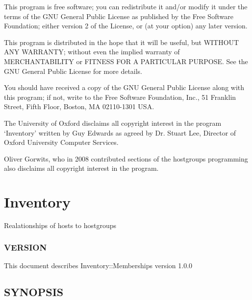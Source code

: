 \documentclass{book}
\begin{document}
This program is free software; you can redistribute it and/or modify it under the terms of the GNU General Public License as published by the Free Software Foundation; either version 2 of the License, or (at your option) any later version.



This program is distributed in the hope that it will be useful, but WITHOUT ANY WARRANTY; without even the implied warranty of MERCHANTABILITY or FITNESS FOR A PARTICULAR PURPOSE. See the GNU General Public License for more details.



You should have received a copy of the GNU General Public License along with this program; if not, write to the Free Software Foundation, Inc., 51 Franklin Street, Fifth Floor, Boston, MA 02110-1301 USA.



The University of Oxford disclaims all copyright interest in the program `Inventory' written by Guy Edwards as agreed by Dr. Stuart Lee, Director of Oxford University Computer Services.



Oliver Gorwits, who in 2008 contributed sections of the hostgroups programming also disclaims all copyright interest in the program.




\section{Inventory}
\label{_Inventory::Memberships}
\hypertarget{_Inventory::Memberships}{}



Realationships of hosts to hostgroups


\subsubsection{VERSION}
\label{Inventory::Memberships_VERSION}
\hypertarget{Inventory::Memberships_VERSION}{}



This document describes Inventory::Memberships version 1.0.0


\subsection{SYNOPSIS}
\label{Inventory::Memberships_SYNOPSIS}
\hypertarget{Inventory::Memberships_SYNOPSIS}{}
\end{document}
